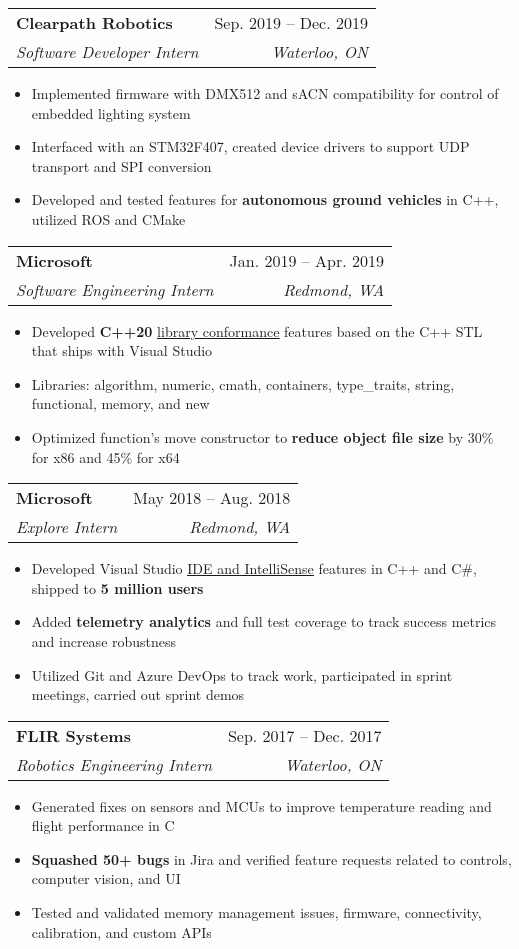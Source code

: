 \documentclass[letterpaper,11pt]{article}
\makeatletter
\newcommand{\resumeItem}[1]{
  \item\small{
    {#1 \vspace{-2pt}}
  }
}
\newcommand{\resumeSubheading}[4]{
  \vspace{-2pt}\item
    \begin{tabular*}{0.97\textwidth}[t]{l@{\extracolsep{\fill}}r}
      \textbf{#1} & #2 \\
      \textit{\small#3} & \textit{\small #4} \\
    \end{tabular*}\vspace{-7pt}
}
\newcommand{\resumeItemListStart}{\begin{itemize}}
\newcommand{\resumeItemListEnd}{\end{itemize}\vspace{-5pt}}
\makeatother
\begin{document}
    \resumeSubheading
      {Clearpath Robotics}{Sep. 2019 -- Dec. 2019}
      {Software Developer Intern}{Waterloo, ON}
      \resumeItemListStart
        \resumeItem{Implemented firmware with DMX512 and sACN compatibility for control of embedded lighting system}
        \resumeItem{Interfaced with an STM32F407, created device drivers to support UDP transport and SPI conversion}
        \resumeItem{Developed and tested features for \textbf{autonomous ground vehicles} in C++, utilized ROS and CMake}
      \resumeItemListEnd

    \resumeSubheading
      {Microsoft}{Jan. 2019 -- Apr. 2019}
      {Software Engineering Intern}{Redmond, WA}
      \resumeItemListStart
        \resumeItem{Developed \textbf{C++20} 
          \href{https://devblogs.microsoft.com/cppblog/c20-features-and-fixes-in-vs-2019-16-1-through-16-6}
          {\underline{library conformance}} 
          features based on the C++ STL that ships with Visual Studio}
        \resumeItem{Libraries: algorithm, numeric, cmath, containers, type\_traits, string, functional, memory, and new}
        \resumeItem{Optimized function's move constructor to \textbf{reduce object file size} by 30\% for x86 and 45\% for x64}
      \resumeItemListEnd

    \resumeSubheading
      {Microsoft}{May 2018 -- Aug. 2018}
      {Explore Intern}{Redmond, WA}
      \resumeItemListStart
        \resumeItem{Developed Visual Studio 
          \href{https://devblogs.microsoft.com/cppblog/c-productivity-improvements-in-visual-studio-2019-preview-2}
          {\underline{IDE and IntelliSense}} 
          features in C++ and C\#, shipped to \textbf{5 million users}}
        \resumeItem{Added \textbf{telemetry analytics} and full test coverage to track success metrics and increase robustness}
        \resumeItem{Utilized Git and Azure DevOps to track work, participated in sprint meetings, carried out sprint demos}
      \resumeItemListEnd

    \resumeSubheading
      {FLIR Systems}{Sep. 2017 -- Dec. 2017}
      {Robotics Engineering Intern}{Waterloo, ON}
      \resumeItemListStart
        \resumeItem{Generated fixes on sensors and MCUs to improve temperature reading and flight performance in C}
        \resumeItem{\textbf{Squashed 50+ bugs} in Jira and verified feature requests related to controls, computer vision, and UI}
        \resumeItem{Tested and validated memory management issues, firmware, connectivity, calibration, and custom APIs}
      \resumeItemListEnd
      
\end{document}
